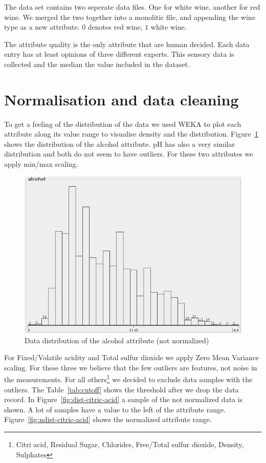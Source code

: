 \documentclass{acm_proc_article-sp}
\begin{document}
The data set contains two seperate data files. One for white wine,
another for red wine. We merged the two together into a monolitic file,
and appending the wine type as a new attribute. $0$ denotes red wine, $1$ white wine.

The attribute quality is the only attribute that are human decided.
Each data entry has at least opinions of three different experts. This
sensory data is collected and the median the value included in the
dataset.

\section{Normalisation and data cleaning}

To get a feeling of the distribution of the data we used
WEKA to plot each attribute along its value range to visualise
density and the distribution.
Figure~\ref{fig:dist-alcohol} shows the distribution of the alcohol attribute. pH has
also a very similar distribution and both do not seem to have outliers.
For these two attributes we apply min/max scaling.

\begin{figure}
\centering
\includegraphics[width=0.6\linewidth]{img/dist-alcohol}
\caption{Data distribution of the alcohol attribute (not normalized)}
\label{fig:dist-alcohol}
\end{figure}


For Fixed/Volatile acidity and Total sulfur dioxide we apply Zero Mean Variance scaling. For these three we 
believe that the few outliers are features, not noise in the measurements.
For all others\footnote{Citri acid, Residual Sugar, Chlorides, Free/Total sulfur dioxide, Density, Sulphates}
we decided to exclude data samples with the outliers. The Table~\ref{tab:cutoff} shows the threshold after we drop
the data record. In Figure~\ref{fig:dist-citric-acid} a sample of the not normalized data is shown. A lot
of samples have a value to the left of the attribute range. Figure~\ref{fig:ndist-citric-acid} shows the
normalized attribute range.
\end{document}
